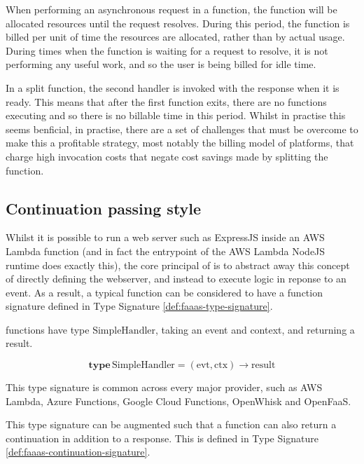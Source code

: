 When performing an asynchronous request in a function, the function will be allocated resources until the request resolves. During this period, the function is billed per unit of time the resources are allocated, rather than by actual usage. During times when the function is waiting for a request to resolve, it is not performing any useful work, and so the user is being billed for idle time.

In a split function, the second handler is invoked with the response when it is ready. This means that after the first function exits, there are no functions executing and so there is no billable time in this period. Whilst in practise this seems benficial, in practise, there are a set of challenges that must be overcome to make this a profitable strategy, most notably the billing model of \faas{} platforms, that charge high invocation costs that negate cost savings made by splitting the function.

\subsection{Continuation passing style}
Whilst it is possible to run a web server such as ExpressJS inside an AWS Lambda function (and in fact the entrypoint of the AWS Lambda NodeJS runtime does exactly this), the core principal of \faas{} is to abstract away this concept of directly defining the webserver, and instead to execute logic in reponse to an event. As a result, a typical \faas{} function can be considered to have a function signature defined in Type Signature \ref{def:faaas-type-signature}.

\begin{signature}
\label{def:faaas-type-signature}
\faas{} functions have type $\textrm{SimpleHandler}$, taking an event and context, and returning a result.

$$\textbf{type}\, \textrm{SimpleHandler} = (\textrm{evt}, \textrm{ctx}) \rightarrow \textrm{result}$$
\end{signature}

This type signature is common across every major \faas{} provider, such as AWS Lambda\cite{amazonAWSLambda2024}, Azure Functions\cite{azureAzureFunctions2024}, Google Cloud Functions\cite{googleGoogleCloudFunctions2024}, OpenWhisk\cite{apacheOpenWhisk2024} and OpenFaaS\cite{ellisOpenFaaS2024}.

This type signature can be augmented such that a function can also return a continuation in addition to a response. This is defined in Type Signature \ref{def:faaas-continuation-signature}.

